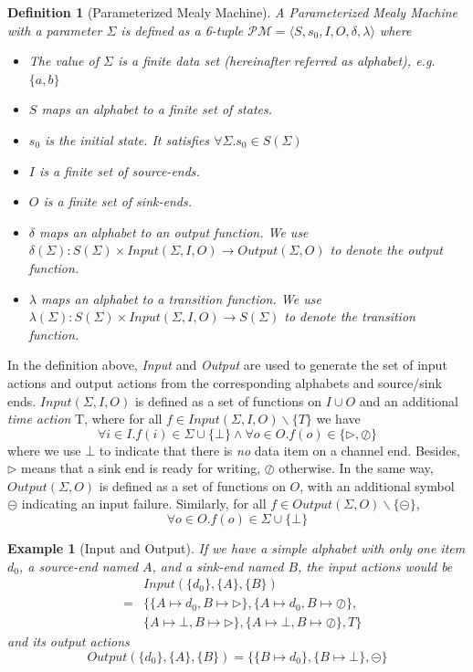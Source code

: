 \documentclass[conference, a4paper]{IEEEtran}
\newtheorem{definition}{Definition}
\newtheorem{example}{Example}
\newcommand{\rblock}[0]{\circleddash}
\newcommand{\rread}[0]{\rhd}
\newcommand{\rnoread}[0]{\oslash}
\begin{document}
\begin{definition}[Parameterized Mealy Machine]
  A \emph{Parameterized Mealy Machine} with a parameter $\Sigma$ is defined as a 6-tuple
  $\mathcal{PM}=\langle S, s_0, I, O, \delta, \lambda\rangle$ where 
  \begin{itemize}
    \item[-] The value of $\Sigma$ is a \emph{finite} data set (hereinafter referred as
      alphabet), e.g. $\{a,b\}$
    \item[-] $S$ maps an alphabet to a \emph{finite} set of states.
    \item[-] $s_0$ is the initial state. It satisfies $\forall \Sigma.s_0\in S(\Sigma)$
    \item[-] $I$ is a finite set of source-ends.
    \item[-] $O$ is a finite set of sink-ends.
    \item[-] $\delta$ maps an alphabet to an \emph{output function}. We use
      $\delta(\Sigma):S(\Sigma)\times Input(\Sigma,I,O)\rightarrow Output(\Sigma,O)$ to denote the
      output function.
    \item[-] $\lambda$ maps an alphabet to a \emph{transition function}. We use
      $\lambda(\Sigma):S(\Sigma)\times Input(\Sigma,I,O)\rightarrow S(\Sigma)$ to denote the
      transition function.
  \end{itemize}
\end{definition}

In the definition above, \emph{Input} and \emph{Output} are used to generate the set of input actions
and output actions from the corresponding alphabets and source/sink ends. $Input(\Sigma,I,O)$ is
defined as a set of functions on $I\cup O$ and an additional \emph{time action} T,  
where for all $f\in Input(\Sigma,I,O)\backslash \{T\}$ we have
\[
\forall i\in I.f(i)\in \Sigma\cup\{\bot\}\land \forall o\in O.f(o)\in\{\rread, \rnoread\}
\]
where we use $\bot$ to indicate that there is \emph{no} data item on a channel end. 
Besides, $\rread$ means that a sink end is ready for writing, $\rnoread$ otherwise. 
In the same way,
$Output(\Sigma,O)$ is defined as a set of functions on $O$, with an additional symbol
$\rblock$ indicating an input failure. Similarly, for all $f\in
Output(\Sigma,O)\backslash\{\rblock\}$,
\[
\forall o\in O. f(o)\in \Sigma\cup\{\bot\}
\]

\begin{example}[Input and Output]
  If we have a simple alphabet with only one item $d_0$, a source-end named $A$, and a
  sink-end named $B$, the input actions would be
  \begin{eqnarray*}
    & & Input(\{d_0\},\{A\},\{B\}) \\
    & = & \{\{A\mapsto d_0,B\mapsto\rread\},\{A\mapsto d_0,B\mapsto\rnoread\}, \\
    & & \{A\mapsto\bot,B\mapsto\rread\}, \{A\mapsto\bot,B\mapsto\rnoread\},T\}
  \end{eqnarray*}
  and its output actions
  \[
  Output(\{d_0\},\{A\},\{B\}) =\{\{B\mapsto d_0\},\{B\mapsto \bot\}, \rblock\}
  \]
\end{example}
\end{document}
